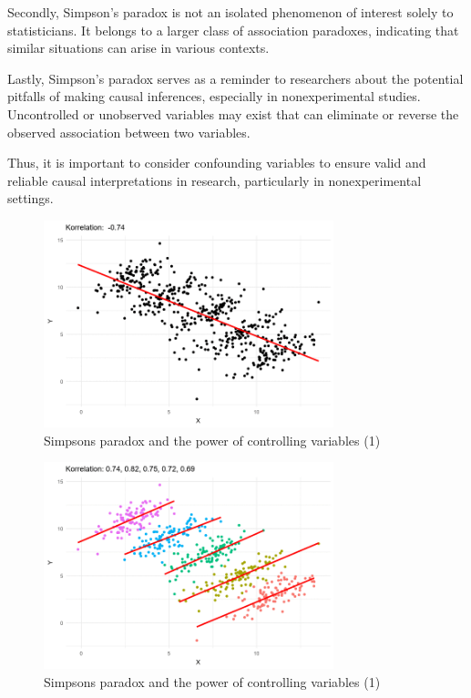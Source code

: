 \documentclass[
  12pt,
  oneside]{book}
\theoremstyle{definition}
\theoremstyle{definition}
\theoremstyle{definition}
\theoremstyle{definition}
\theoremstyle{remark}
\begin{document}
Secondly, Simpson's paradox is not an isolated phenomenon of interest solely to statisticians. It belongs to a larger class of association paradoxes, indicating that similar situations can arise in various contexts.

Lastly, Simpson's paradox serves as a reminder to researchers about the potential pitfalls of making causal inferences, especially in nonexperimental studies. Uncontrolled or unobserved variables may exist that can eliminate or reverse the observed association between two variables.

Thus, it is important to consider confounding variables to ensure valid and reliable causal interpretations in research, particularly in nonexperimental settings.

\begin{figure}
\centering
\includegraphics[width=0.75\textwidth,height=\textheight]{fig/foo-13.png}
\caption{\label{fig:foo13} Simpsons paradox and the power of controlling variables (1)}
\end{figure}

\begin{figure}
\centering
\includegraphics[width=0.75\textwidth,height=\textheight]{fig/foo-32.png}
\caption{\label{fig:foo32} Simpsons paradox and the power of controlling variables (1)}
\end{figure}
\end{document}
